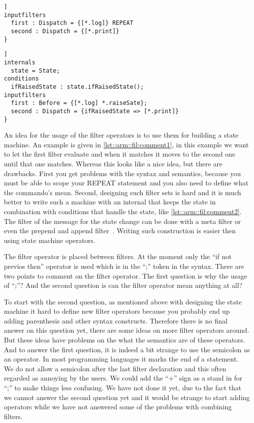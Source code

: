 \begin{lstlisting}[caption = {Idea for a filter state machine}, label=lst::arm::fil:comment1,style = listing, language = ComposeStar,float=[tpb]]
inputfilters
  first : Dispatch = {[*.log]} REPEAT
  second : Dispatch = {[*.print]}
}
\end{lstlisting}
\begin{lstlisting}[caption = {State machine with filter operators}, label=lst::arm::fil:comment2,style = listing, language = ComposeStar,float=[tpb]]
internals
  state = State;
conditions
  ifRaisedState : state.ifRaisedState();
inputfilters
  first : Before = {[*.log] *.raiseSate};
  second : Dispatch = {ifRaisedState => [*.print]}
}
\end{lstlisting}
An idea for the usage of the filter operators is to use them for building a state machine. An example is given in \autoref{lst::arm::fil:comment1}, in this example we want to let the first filter evaluate and when it matches it moves to the second one until that one matches.
Whereas this looks like a nice idea, but there are drawbacks. 
First you get problems with the syntax and semantics, because you must be able to scope your REPEAT statement and you also need to define what the commando's mean. 
Second, designing such filter sets is hard and it is much better to write such a machine with an internal that keeps the state in combination with conditions that handle the state, like \autoref{lst::arm::fil:comment2}.
The filter of the message for the state change can be done with a meta filter or even the prepend and append filter~\cite{Minnen2006}. 
Writing such construction is easier then using state machine operators.

The filter operator is placed between filters. At the moment only the ``if not previos then'' operator is used which is in the ``;'' token in the syntax. 
There are two points to comment on the filter operator. 
The first question is why the usage of ``;''? 
And the second question is can the filter operator mean anything at all?

To start with the second question, as mentioned above with designing the state machine it hard to define new filter operators because you probably end up adding parenthesis and other syntax constructs. 
Therefore there is no final answer on this question yet, there are some ideas on more filter operators around.
But these ideas have problems on the what the semantics are of these operators.
And to answer the first question, it is indeed a bit strange to use the semicolon as an operator. 
In most programming languages it marks the end of a statement. 
We do not allow a semicolon after the last filter declaration and this often regarded as annoying by the users. 
We could add the ``+'' sign as a stand in for ``;'' to make things less confusing. We have not done it yet, due to the fact that we cannot answer the second question yet and it would be strange to start adding operators while we have not answered some of the problems with combining filters.
